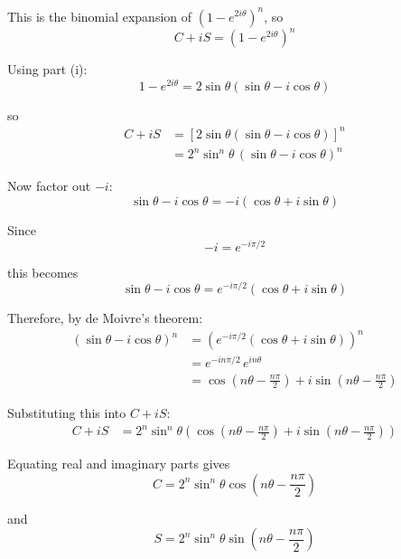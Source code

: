 \documentclass[leqno]{article}
\begin{document}
\begin{enumerate}[
  label=\textbf{\arabic*.},
  leftmargin=*,
  topsep=0pt,
  partopsep=0pt,
  parsep=0pt
]
\begin{djsSolution}
\begin{enumerate}[label=\textbf{(\roman*)}]
This is the binomial expansion of \((1-e^{2i\theta})^n\), so
\[
C+iS=(1-e^{2i\theta})^n
\]

Using part (i):
\[
1-e^{2i\theta}=2\sin\theta(\sin\theta-i\cos\theta)
\]

so
\begin{align*}
C+iS
&=\left[2\sin\theta(\sin\theta-i\cos\theta)\right]^n\\
&=2^n\sin^n\theta\,(\sin\theta-i\cos\theta)^n
\end{align*}

Now factor out \(-i\):
\[
\sin\theta-i\cos\theta
=
-i(\cos\theta+i\sin\theta)
\]

Since
\[
-i=e^{-i\pi/2}
\]

this becomes
\[
\sin\theta-i\cos\theta
=
e^{-i\pi/2}(\cos\theta+i\sin\theta)
\]

Therefore, by de Moivre's theorem:
\begin{align*}
(\sin\theta-i\cos\theta)^n
&=\left(e^{-i\pi/2}(\cos\theta+i\sin\theta)\right)^n\\
&=e^{-in\pi/2}\,e^{in\theta}\\
&=\cos\left(n\theta-\frac{n\pi}{2}\right)+i\sin\left(n\theta-\frac{n\pi}{2}\right)
\end{align*}

Substituting this into \(C+iS\):
\begin{align*}
C+iS
&=2^n\sin^n\theta\left(\cos\left(n\theta-\frac{n\pi}{2}\right)+i\sin\left(n\theta-\frac{n\pi}{2}\right)\right)
\end{align*}

Equating real and imaginary parts gives
\[
C=2^n\sin^n\theta\cos\left(n\theta-\frac{n\pi}{2}\right)
\]

and
\[
S=2^n\sin^n\theta\sin\left(n\theta-\frac{n\pi}{2}\right)
\]
\end{enumerate}
\end{djsSolution}


\newpage
\end{enumerate}
\end{document}
